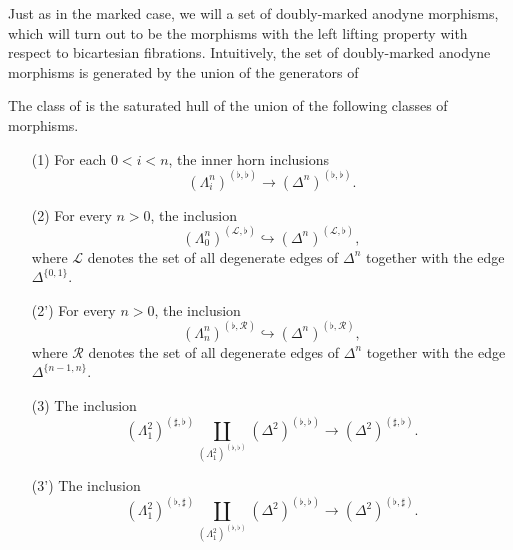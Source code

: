 \documentclass[main.tex]{subfiles}
\begin{document}
Just as in the marked case, we will a set of doubly-marked anodyne morphisms, which will turn out to be the morphisms with the left lifting property with respect to bicartesian fibrations. Intuitively, the set of doubly-marked anodyne morphisms is generated by the union of the generators of

\begin{definition}
  The class of  is the saturated hull of the union of the following classes of morphisms.
  \begin{enumerate}
    \item[(1)] For each $0  < i < n$, the inner horn inclusions
      \begin{equation*}
        (\Lambda^{n}_{i})^{(\flat, \flat)} \to (\Delta^{n})^{(\flat, \flat)}.
      \end{equation*}

    \item[(2)] For every $n > 0$, the inclusion
      \begin{equation*}
        (\Lambda^{n}_{0})^{(\mathcal{L}, \flat)} \hookrightarrow (\Delta^{n})^{(\mathcal{L}, \flat)},
      \end{equation*}
      where $\mathcal{L}$ denotes the set of all degenerate edges of $\Delta^{n}$ together with the edge $\Delta^{\{0, 1\}}$.

    \item[(2')] For every $n > 0$, the inclusion
      \begin{equation*}
        (\Lambda^{n}_{n})^{(\flat, \mathcal{R})} \hookrightarrow (\Delta^{n})^{(\flat, \mathcal{R})},
      \end{equation*}
      where $\mathcal{R}$ denotes the set of all degenerate edges of $\Delta^{n}$ together with the edge $\Delta^{\{n-1, n\}}$.

    \item[(3)] The inclusion
      \begin{equation*}
        (\Lambda^{2}_{1})^{(\sharp, \flat)} \coprod_{(\Lambda^{2}_{1})^{(\flat, \flat)}} (\Delta^{2})^{(\flat, \flat)} \to (\Delta^{2})^{(\sharp, \flat)}.
      \end{equation*}

    \item[(3')] The inclusion
      \begin{equation*}
        (\Lambda^{2}_{1})^{(\flat, \sharp)} \coprod_{(\Lambda^{2}_{1})^{(\flat, \flat)}} (\Delta^{2})^{(\flat, \flat)} \to (\Delta^{2})^{(\flat, \sharp)}.
      \end{equation*}


\end{enumerate}
\end{definition}
\end{document}
